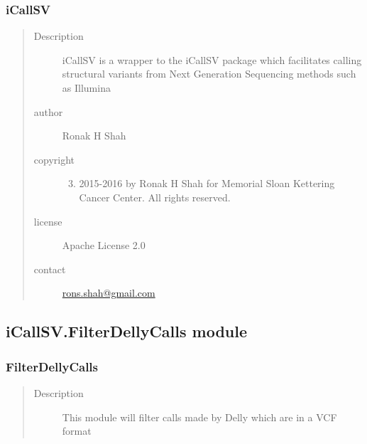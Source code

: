 \documentclass[letterpaper,10pt,english]{sphinxmanual}
\begin{document}
\subsubsection{iCallSV}
\label{iCallSV:icallsv}\begin{quote}\begin{description}
\item[{Description}] \leavevmode
iCallSV is a wrapper to the iCallSV package which facilitates calling structural variants from Next Generation Sequencing methods such as Illumina

\item[{author}] \leavevmode
Ronak H Shah

\item[{copyright}] \leavevmode\begin{enumerate}
\setcounter{enumi}{2}
\item {} 
2015-2016 by Ronak H Shah for Memorial Sloan Kettering Cancer Center. All rights reserved.

\end{enumerate}

\item[{license}] \leavevmode
Apache License 2.0

\item[{contact}] \leavevmode
\href{mailto:rons.shah@gmail.com}{rons.shah@gmail.com}

\end{description}\end{quote}


\subsection{iCallSV.FilterDellyCalls module}
\label{iCallSV:icallsv-filterdellycalls-module}\label{iCallSV:module-iCallSV.FilterDellyCalls}

\subsubsection{FilterDellyCalls}
\label{iCallSV:filterdellycalls}\begin{quote}\begin{description}
\item[{Description}] \leavevmode
This module will filter calls made by Delly which are in a VCF format

\end{description}\end{quote}
\end{document}
